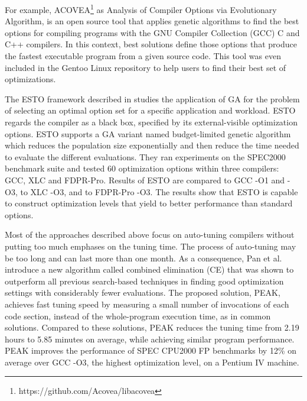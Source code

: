 For example, ACOVEA\footnote{https://github.com/Acovea/libacovea} as Analysis of Compiler Options via Evolutionary Algorithm, is an open source tool that applies genetic algorithms to find the best options for compiling programs with the GNU Compiler Collection (GCC) C and C++ compilers. In this context, best solutions define those options that produce the fastest executable program from a given source code. This tool was even included in the Gentoo Linux
repository to help users to find their best set of optimizations.

The ESTO framework described in \cite{bashkansky2007black} studies the application of GA for the problem of selecting an optimal option set for a specific application and workload. ESTO regards the compiler as a black box, specified by its external-visible optimization options. ESTO supports a GA variant named budget-limited genetic algorithm which reduces the population size exponentially and then reduce the time needed to evaluate the different evaluations. They ran experiments on the SPEC2000 benchmark suite and tested 60 optimization options within three compilers: GCC, XLC and FDPR-Pro. Results of ESTO are compared to GCC -O1 and -O3, to XLC -O3, and to FDPR-Pro -O3. The results show that ESTO is capable to construct optimization levels that yield to better performance than standard options.

Most of the approaches described above focus on auto-tuning compilers without putting too much emphases on the tuning time. The process of auto-tuning may be too long and can last more than one month\cite{hoste2008cole}. As a consequence, Pan et al.\cite{pan2006fast} introduce a new algorithm called combined elimination (CE) that was shown to outperform all previous search-based techniques in finding good optimization settings with considerably fewer evaluations. The proposed solution, PEAK, achieves fast tuning speed by measuring a small number of invocations of each code section, instead of the whole-program execution time, as in common solutions. Compared to these solutions, PEAK reduces the tuning time from 2.19 hours to 5.85 minutes on average, while achieving similar program performance.
PEAK improves the performance of SPEC CPU2000 FP benchmarks by 12\% on average over GCC -O3, the highest optimization level, on a Pentium IV machine.



